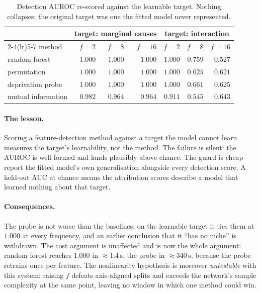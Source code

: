 \begin{table}[t]\centering\small
\caption{Detection AUROC re-scored against the learnable target. Nothing
collapses; the original target was one the fitted model never represented.}
\label{tab:rescore}
\begin{tabular}{lrrr@{\hskip 2em}rrr}
\toprule
& \multicolumn{3}{c}{target: marginal causes} & \multicolumn{3}{c}{target: interaction} \\
\cmidrule(lr){2-4}\cmidrule(lr){5-7}
method & $f{=}2$ & $f{=}8$ & $f{=}16$ & $f{=}2$ & $f{=}8$ & $f{=}16$ \\
\midrule
random forest        & $1.000$ & $\mathbf{1.000}$ & $\mathbf{1.000}$ & $1.000$ & $0.759$ & $0.527$ \\
permutation          & $1.000$ & $\mathbf{1.000}$ & $\mathbf{1.000}$ & $1.000$ & $0.625$ & $0.621$ \\
deprivation probe    & $1.000$ & $\mathbf{1.000}$ & $\mathbf{1.000}$ & $1.000$ & $0.661$ & $0.625$ \\
mutual information   & $0.982$ & $0.964$ & $0.964$ & $0.911$ & $0.545$ & $0.643$ \\
\bottomrule
\end{tabular}
\end{table}

\paragraph{The lesson.} Scoring a feature-detection method against a target the
model cannot learn measures the target's learnability, not the method. The
failure is silent: the AUROC is well-formed and lands plausibly above chance.
The guard is cheap---report the fitted model's own generalisation alongside every
detection score. A held-out AUC at chance means the attribution scores describe a
model that learned nothing about that target.

\paragraph{Consequences.} The probe is not worse than the baselines; on the
learnable target it ties them at $1.000$ at every frequency, and an earlier
conclusion that it ``has no niche'' is withdrawn. The cost argument is
unaffected and is now the whole argument: random forest reaches $1.000$ in
$\approx1.4$\,s, the probe in $\approx340$\,s, because the probe retrains once
per feature. The nonlinearity hypothesis is moreover \emph{untestable} with this
system: raising $f$ defeats axis-aligned splits and exceeds the network's sample
complexity at the same point, leaving no window in which one method could win.

